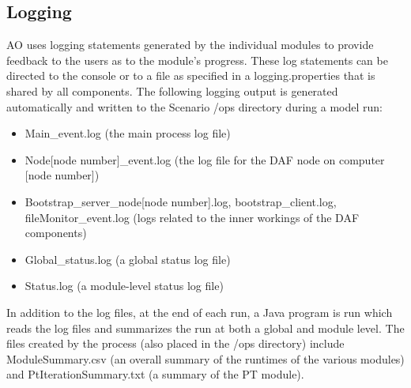 \subsection{Logging}

AO uses logging statements generated by the individual modules to provide feedback to the users as to the module's progress. These log statements can be directed to the console or to a file as specified in a logging.properties that is shared by all components. The following logging output is generated automatically and written to the Scenario /ops directory during a model run:
\begin{itemize}
\item Main\_event.log (the main process log file)
\item Node[node number]\_event.log (the log file for the DAF node on computer [node number])
\item Bootstrap\_server\_node[node number].log, bootstrap\_client.log, fileMonitor\_event.log (logs related to the inner workings of the DAF components)
\item Global\_status.log (a global status log file)
\item Status.log (a module-level status log file)
\end{itemize}

\noindent In addition to the log files, at the end of each run, a Java program is run which reads the log files and summarizes the run at both a global and module level. The files created by the process (also placed in the /ops directory) include ModuleSummary.csv (an overall summary of the runtimes of the various modules) and PtIterationSummary.txt (a summary of the PT module). 
 
